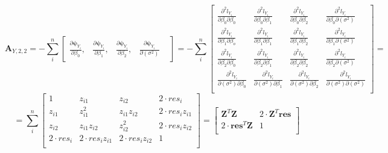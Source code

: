 \documentclass[]{article}
\begin{document}
\[
\pmb{A}_{Y,2,2} = -\sum_i^n\begin{bmatrix}
    \frac{\partial \pmb{\psi}_{Y_i}}{ \partial \beta_0},  &
    \frac{\partial \pmb{\psi}_{Y_i}}{ \partial \beta_1}, &
    \frac{\partial \pmb{\psi}_{Y_i}}{ \partial \beta_2}, &
    \frac{\partial \pmb{\psi}_{Y_i}}{ \partial (\sigma^2)} &
\end{bmatrix}
 =-\sum_i^n\begin{bmatrix}
    \frac{\partial^2 l_{Y_i}}{ \partial \beta_0\partial \beta_0}  & \frac{\partial^2 l_{Y_i}}{ \partial \beta_0\partial \beta_1} & \frac{\partial^2 l_{Y_i}}{ \partial \beta_0\partial \beta_2} & \frac{\partial^2 l_{Y_i}}{ \partial \beta_0 \partial (\sigma^2)}\\
    \frac{\partial^2 l_{Y_i}}{ \partial \beta_1\partial \beta_o}  & \frac{\partial^2 l_{Y_i}}{ \partial \beta_1\partial \beta_1} & \frac{\partial^2 l_{Y_i}}{ \partial \beta_1\partial \beta_2} & \frac{\partial^2 l_{Y_i}}{ \partial \beta_1 \partial (\sigma^2)}\\
    \frac{\partial^2 l_{Y_i}}{ \partial \beta_2\partial \beta_0}  & \frac{\partial^2 l_{Y_i}}{ \partial \beta_2\partial \beta_1} & \frac{\partial^2 l_{Y_i}}{ \partial \beta_2\partial \beta_2} & \frac{\partial^2 l_{Y_i}}{ \partial \beta_2 \partial (\sigma^2)}\\
    \frac{\partial^2 l_{Y_i}}{ \partial (\sigma^2) \partial \beta_0}  & \frac{\partial^2 l_{Y_i}}{ \partial (\sigma^2) \partial \beta_1} & \frac{\partial^2 l_{Y_i}}{ \partial (\sigma^2)\partial \beta_2} & \frac{\partial^2 l_{Y_i}}{ \partial (\sigma^2) \partial (\sigma^2)}\\
\end{bmatrix} =
\]
\[
  =\sum_i^n\begin{bmatrix}
    1   &  z_{i1}   & z_{i2}  &  2 \cdot res_i\\
    z_{i1}   &  z_{i1}^2   & z_{i1}z_{i2}  &  2 \cdot res_iz_{i1} \\
    z_{i2}   &  z_{i1}z_{i2}   & z_{i2}^2  &  2 \cdot res_iz_{i2}  \\
    2 \cdot res_i   & 2 \cdot res_iz_{i1}   & 2 \cdot res_iz_{i2}  &  1 \\
\end{bmatrix}=
\begin{bmatrix}
  \pmb{Z}^T\pmb{Z} & 2 \cdot \pmb{Z}^T \pmb{res}\\
  2 \cdot \pmb{res}^T\pmb{Z} & 1\\
  \end{bmatrix}
\]
\end{document}
